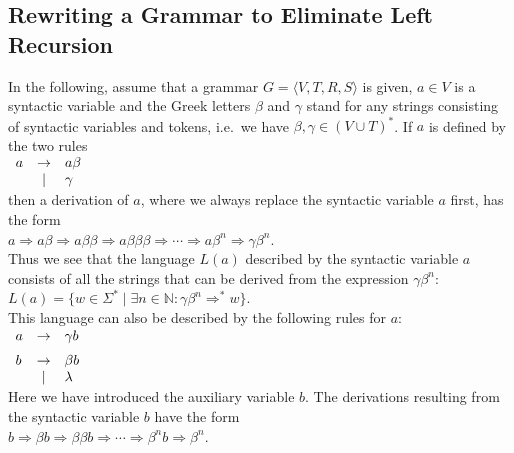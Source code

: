 \subsection{Rewriting a  Grammar to Eliminate Left Recursion \label{left-recursion}}
In the following, assume that a grammar $G = \langle V, T, R, S \rangle$ is given, $a \in V$ is a syntactic
variable and the Greek letters $\beta$ and $\gamma$ stand for any strings consisting of syntactic variables and
tokens, i.e.~we have $\beta, \gamma \in (V \cup T)^*$.  If  $a$ is defined by the two rules
\\[0.2cm]
\hspace*{1.3cm}
$
\begin{array}[t]{lcl}
a & \rightarrow & a \beta \\
  & \mid & \gamma
\end{array}
$
\\[0.2cm]
then a derivation of $a$, where we always replace the syntactic variable $a$ first, has the form 
\\[0.2cm]
\hspace*{1.3cm}
$a \Rightarrow a \beta \Rightarrow a \beta \beta \Rightarrow a \beta \beta \beta
 \Rightarrow \cdots \Rightarrow a \beta^n \Rightarrow \gamma \beta^n$.
\\[0.2cm]
Thus we see that the language $L(a)$ described by the syntactic variable $a$ consists of all the
strings that can be derived from the expression $\gamma \beta^n$:
\\[0.2cm]
\hspace*{1.3cm}
$L(a) = \bigl\{ w \in \Sigma^* \mid \exists n \in \mathbb{N}: \gamma \beta^n \Rightarrow^* w \bigr\}$.
\\[0.2cm]
This language can also be described by the following rules for $a$:
\\[0.2cm]
\hspace*{1.3cm}
$
\begin{array}[t]{lcl}
a & \rightarrow & \gamma b \\[0.2cm]
b & \rightarrow & \beta b \\
  & \mid & \lambda 
\end{array}
$
\\[0.2cm]
Here we have introduced the auxiliary variable $b$.  The derivations resulting from the syntactic variable $b$
have the form
\\[0.2cm]
\hspace*{1.3cm} $b \Rightarrow \beta b \Rightarrow \beta \beta b \Rightarrow \cdots \Rightarrow
\beta^n b \Rightarrow \beta^n$.
\\[0.2cm]
